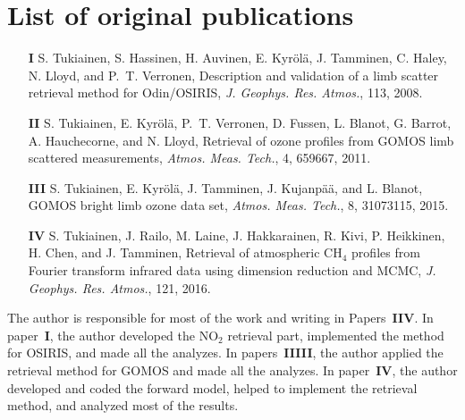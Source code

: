 \documentclass[11pt,b5paper]{book}
\begin{document}
\section*{List of original publications}

\thispagestyle{empty}

\vspace{0.5cm}
\begin{itemize}
\setlength\itemsep{1.5em}
\item[\textbf{I}] S. Tukiainen, S. Hassinen, H. Auvinen,
  E. Kyr\"ol\"a, J. Tamminen, C. Haley, N. Lloyd, and P.~T. Verronen, Description and validation of a 
limb scatter retrieval method for Odin/OSIRIS, \emph{J. Geophys. Res. Atmos.}, 113, 2008.

\item[\textbf{II}] S. Tukiainen, E. Kyr\"ol\"a, P.~T. Verronen, D. Fussen, L. Blanot, G. Barrot, A. Hauchecorne, and 
N. Lloyd, Retrieval of ozone profiles from \mbox{GOMOS} limb scattered measurements, \emph{Atmos. Meas. Tech.}, 4, 659\textendash{}667, 2011.

\item[\textbf{III}] S. Tukiainen, E. Kyr\"ol\"a, J. Tamminen, J. Kujanpää, and L. Blanot, \mbox{GOMOS} bright limb ozone data set, 
\emph{Atmos. Meas. Tech.}, 8, 3107\textendash{}3115, 2015.

\item[\textbf{IV}] S. Tukiainen, J. Railo, M. Laine, J. Hakkarainen, R. Kivi, P. Heikkinen, H. Chen, and J. Tamminen, 
Retrieval of atmospheric CH$_4$ profiles from Fourier transform infrared data using dimension reduction and MCMC, \emph{J. Geophys. Res. Atmos.}, 121, 2016.

\end{itemize}

\vspace{1cm}

\noindent{}The author is responsible for most of the work and writing in Papers~\textbf{I}\textendash{}\textbf{IV}. In paper~\textbf{I}, the author 
developed the NO$_2$ retrieval part, implemented the method for OSIRIS, and made all the analyzes. In papers~\textbf{II}\textendash{}\textbf{III},
the author applied the retrieval method for \mbox{GOMOS} and made all the analyzes. In paper~\textbf{IV}, the author 
developed and coded the forward model, helped to implement the retrieval method, and analyzed most of the results. 

\newpage
\phantom{blabla}
\thispagestyle{empty}
\newpage
\vspace*{3cm}

\newpage
\clearpage

\end{document}

